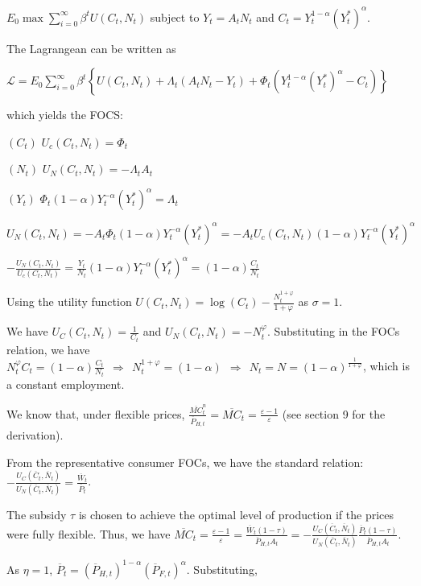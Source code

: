\documentclass[
]{article}
\begin{document}
\(\displaystyle E_0\max \sum_{i=0}^\infty \beta^t U(C_t,N_t)\) subject
to \(Y_t=A_tN_t\) and \(C_t=Y_t^{1-\alpha}(Y_t^*)^\alpha\).

The Lagrangean can be written as

\(\displaystyle \mathcal{L}= E_0 \sum_{i=0}^\infty \beta^t \left\{ U(C_t,N_t) +\Lambda_t(A_t N_t - Y_t) + \Phi_t \left( Y_t^{1-\alpha}(Y_t^*)^\alpha -C_t \right) \right\}\)

which yields the FOCS:

\((C_t)\) \(U_c(C_t,N_t)=\Phi_t\)

\((N_t)\) \(U_N(C_t,N_t)=-\Lambda_t A_t\)

\((Y_t)\) \(\Phi_t (1-\alpha)Y_t^{-\alpha}(Y_t^*)^\alpha =\Lambda_t\)

\(U_N(C_t,N_t) = -A_t \Phi_t (1-\alpha)Y_t^{-\alpha}(Y_t^*)^\alpha = -A_t U_c(C_t,N_t) (1-\alpha)Y_t^{-\alpha}(Y_t^*)^\alpha\)

\(\displaystyle -\frac{U_N(C_t,N_t)}{U_c(C_t,N_t)} = \frac{Y_t}{N_t} (1-\alpha)Y_t^{-\alpha}(Y_t^*)^\alpha=(1-\alpha) \frac{C_t}{N_t}\)

Using the utility function
\(\displaystyle U(C_t,N_t)=\log(C_t)-\frac{N_t^{1+\varphi}}{1+\varphi}\)
as \(\sigma=1\).

We have \(\displaystyle U_C(C_t,N_t)=\frac{1}{C_t}\) and
\(\displaystyle U_N(C_t,N_t)=-N_t^\varphi\). Substituting in the FOCs
relation, we have
\(\displaystyle N_t^\varphi C_t=(1-\alpha)\frac{C_t}{N_t} \ \ \Rightarrow \ \ N_t^{1+\varphi}=(1-\alpha) \ \ \Rightarrow \ \ N_t = N = (1-\alpha)^{\frac{1}{1+\varphi}}\),
which is a constant employment.

We know that, under flexible prices,
\(\displaystyle \frac{\overline{MC}_t^n}{\overline{P}_{H,t}}=\overline{MC}_t=\frac{\varepsilon-1}{\varepsilon}\)
(see section 9 for the derivation).

From the representative consumer FOCs, we have the standard relation:
\(\displaystyle -\frac{U_C(\overline{C}_t,\overline{N}_t)}{U_N(\overline{C}_t,\overline{N}_t)}=\frac{\overline{W}_t}{\overline{P}_t}\).

The subsidy \(\tau\) is chosen to achieve the optimal level of
production if the prices were fully flexible. Thus, we have
\(\displaystyle \overline{MC}_t=\frac{\varepsilon-1}{\varepsilon}=\frac{\overline{W}_t (1-\tau)}{\overline{P}_{H,t} A_t}=-\frac{U_C(\overline{C}_t,\overline{N}_t)}{U_N(\overline{C}_t,\overline{N}_t)}\frac{\overline{P}_t (1-\tau)}{\overline{P}_{H,t} A_t}\).

As \(\eta=1\),
\(\overline{P}_t=(\overline{P}_{H,t})^{1-\alpha}(\overline{P}_{F,t})^\alpha\).
Substituting,
\end{document}
